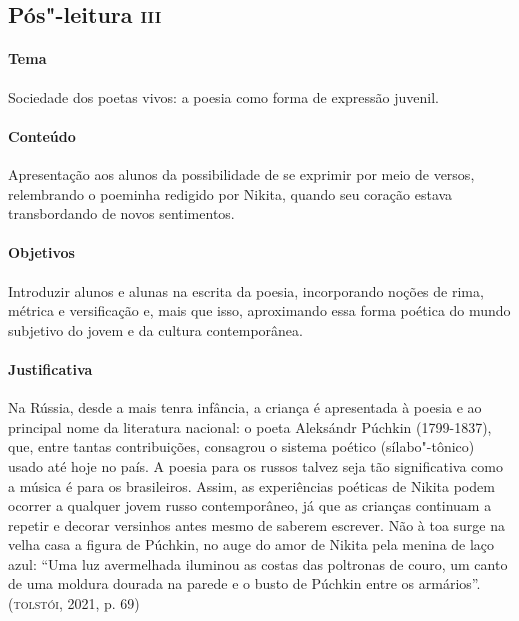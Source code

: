 \documentclass[11pt]{extarticle}
\begin{document}

\subsection{Pós"-leitura \textsc{iii}}

\paragraph{Tema} Sociedade dos poetas vivos: a poesia como forma de expressão
juvenil.


\paragraph{Conteúdo}
Apresentação aos alunos da possibilidade de se exprimir por meio de
versos, relembrando o poeminha redigido por Nikita, quando seu coração
estava transbordando de novos sentimentos.

\paragraph{Objetivos}
Introduzir alunos e alunas na escrita da poesia, incorporando noções de
rima, métrica e versificação e, mais que isso, aproximando essa forma
poética do mundo subjetivo do jovem e da cultura contemporânea.

\paragraph{Justificativa}
Na Rússia, desde a mais tenra infância, a criança é apresentada à poesia
e ao principal nome da literatura nacional: o poeta Aleksándr Púchkin
(1799-1837), que, entre tantas contribuições, consagrou o sistema
poético (sílabo"-tônico) usado até hoje no país. A poesia para os russos
talvez seja tão significativa como a música é para os brasileiros.
Assim, as experiências poéticas de Nikita podem ocorrer a qualquer jovem
russo contemporâneo, já que as crianças continuam a repetir e
decorar versinhos antes mesmo de saberem escrever. Não à toa surge na
velha casa a figura de Púchkin, no auge do amor de Nikita pela menina de
laço azul: ``Uma luz avermelhada iluminou as costas das poltronas de
couro, um canto de uma moldura dourada na parede e o busto de Púchkin
entre os armários''. (\textsc{tolstói}, 2021, p. 69)
\end{document}
